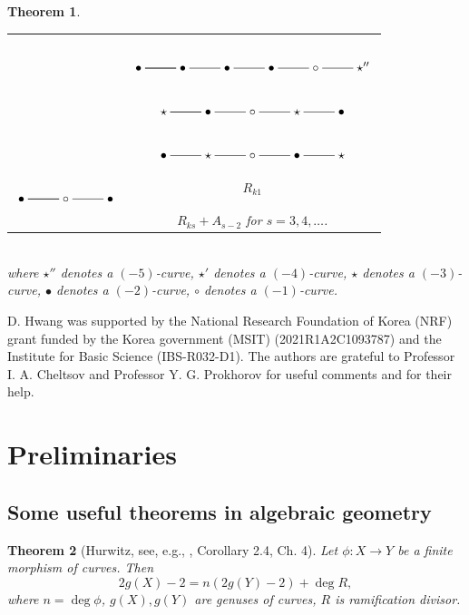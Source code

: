 \documentclass[10pt,oneside,reqno]{amsart}
\newtheorem{theorem}{Theorem}[section]
\theoremstyle{definition}
\theoremstyle{remark}
\numberwithin{equation}{section}
\begin{document}
\begin{theorem}
\begin{enumerate}
\begin{tabular}{|c|c|}
& $\xymatrix@R=0.8em{\\
\bullet\ar@{-}[r]\ar@{-}[r]&\bullet\ar@{-}[r]&\bullet\ar@{-}[r]&\bullet\ar@{-}[r]&\circ\ar@{-}[r]&\star''
}$\\
& $\xymatrix@R=0.8em{\\
\star\ar@{-}[r]\ar@{-}[r]&\bullet\ar@{-}[r]&\circ\ar@{-}[r]&\star\ar@{-}[r]&\bullet
}$\\
& $\xymatrix@R=0.8em{\\
\bullet\ar@{-}[r]&\star\ar@{-}[r]&\circ\ar@{-}[r]&\bullet\ar@{-}[r]&\star
}$\\
\hline $
\xymatrix@R=0.8em{\\
\bullet\ar@{-}[r]\ar@{-}[r]&\circ\ar@{-}[r]&\bullet
}
$ & $R_{k1}$\\
& $R_{ks}+A_{s-2}$ for $s=3,4,\ldots$.\\
\hline
\end{tabular}\\
where $\star''$ denotes a $(-5)$-curve, $\star'$ denotes a $(-4)$-curve, $\star$ denotes a $(-3)$-curve, $\bullet$ denotes a $(-2)$-curve, $\circ$ denotes a $(-1)$-curve.

\end{enumerate}
\end{theorem}





D. Hwang was supported by the National Research Foundation of Korea (NRF) grant funded by the Korea government (MSIT) (2021R1A2C1093787) and the Institute for Basic Science (IBS-R032-D1). The authors are grateful to Professor I. A. Cheltsov and Professor Y. G. Prokhorov for useful comments and for their help.

\section{Preliminaries}
\subsection{Some useful theorems in algebraic geometry}
\begin{theorem}[Hurwitz, see, e.g., {\cite{Har}}, Corollary 2.4, Ch. 4]
\label{Hurwitz} Let $\phi\colon X\rightarrow Y$ be a finite morphism of curves. Then \[2g(X)-2=n(2g(Y)-2)+\deg R,\] where $n=\deg\phi$, $g(X), g(Y)$ are genuses of curves, $R$ is ramification divisor.
\end{theorem}
\end{document}
